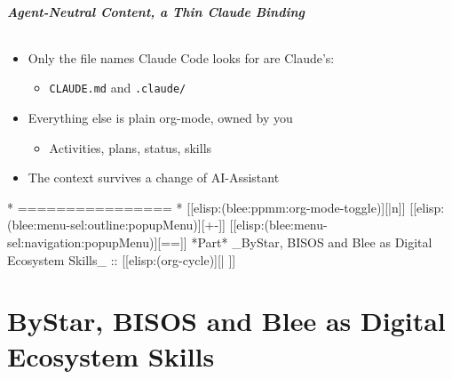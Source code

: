 \begin{whenOrg}
\begin{verblatex}

\begin{frame}[fragile,plain,label=agentNeutral]
    \frametitle{Agent-Neutral Content, a Thin Claude Binding}
    \framesubtitle{}

\begin{itemize}
  \item Only the file names Claude Code looks for are Claude's:
    \begin{itemize}
    \item \texttt{CLAUDE.md} and \texttt{.claude/}
    \end{itemize}
  \item Everything else is plain org-mode, owned by you
    \begin{itemize}
    \item Activities, plans, status, skills
    \end{itemize}
  \item The context survives a change of AI-Assistant
  \end{itemize}


\end{frame}
\end{verblatex}



\begin{whenOrg}
*      ================
*  [[elisp:(blee:ppmm:org-mode-toggle)][|n]] [[elisp:(blee:menu-sel:outline:popupMenu)][+-]] [[elisp:(blee:menu-sel:navigation:popupMenu)][==]]  *Part*   _ByStar, BISOS and Blee as Digital Ecosystem Skills_ ::  [[elisp:(org-cycle)][| ]]
\end{whenOrg}

\newpage
\part{ByStar, BISOS and Blee as Digital Ecosystem Skills}


\end{whenOrg}
